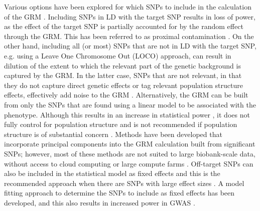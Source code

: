 \documentclass[doublespacing]{bmcart}
\begin{document}
Various options have been explored for which SNPs to include in the calculation of the GRM \cite{yang2014advantages}. Including SNPs in LD with the target SNP results in loss of power, as the effect of the target SNP is partially accounted for by the random effect through the GRM. This has been referred to as proximal contamination \cite{listgarten2012improved}. On the other hand, including all (or most) SNPs that are not in LD with the target SNP, e.g. using a Leave One Chromosome Out (LOCO) approach, can result in dilution of the extent to which the relevant part of the genetic background is captured by the GRM. In the latter case, SNPs that are not relevant, in that they do not capture direct genetic effects or tag relevant population structure effects, effectively add noise to the GRM \cite{listgarten2012improved}. Alternatively, the GRM can be built from only the SNPs that are found using a linear model to be associated with the phenotype. Although this results in an increase in statistical power \cite{fastlmm,yang2014advantages,lippert2013benefits}, it does not fully control for population structure and is not recommended if population structure is of substantial concern \cite{BOLT,yang2014advantages}. Methods have been developed that incorporate principal components into the GRM calculation built from significant SNPs; however, most of these methods are not suited to large biobank-scale data, without access to cloud computing or large compute farms \cite{tucker2014improving,canela2018atlas,kadie2019ludicrous}. Off-target SNPs can also be included in the statistical model as fixed effects and this is the recommended approach when there are SNPs with large effect sizes \cite{yang2014advantages}. A model fitting approach to determine the SNPs to include as fixed effects has been developed, and this also results in increased power in GWAS \cite{listgarten2012improved}.  

\par 
\end{document}
